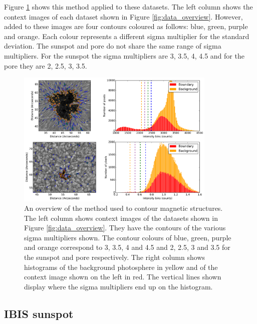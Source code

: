     Figure \ref{fig:method_overview} shows this method applied to these datasets.
    The left column shows the context images of each dataset shown in Figure \ref{fig:data_overview}.
    However, added to these images are four contours coloured as follows: blue, green, purple and orange.
    Each colour represents a different sigma multiplier for the standard deviation.
    The sunspot and pore do not share the same range of sigma multipliers.
    For the sunspot the sigma multipliers are 3, 3.5, 4, 4.5 and for the pore they are 2, 2.5, 3, 3.5.

    \begin{figure}
        \centering
        \includegraphics[width=0.85\textwidth]{method_overview.pdf}
        \caption{
                An overview of the method used to contour magnetic structures.
                The left column shows context images of the datasets shown in Figure \ref{fig:data_overview}.
                They have the contours of the various sigma multipliers shown.
                The contour colours of blue, green, purple and orange correspond to 3, 3.5, 4 and 4.5 and 2, 2.5, 3 and 3.5 for the sunspot and pore respectively.
                The right column shows histograms of the background photosphere in yellow and of the context image shown on the left in red.
                The vertical lines shown display where the sigma multipliers end up on the histogram.
                }
        \label{fig:method_overview}
    \end{figure}
    
    \subsection{IBIS sunspot}
    
